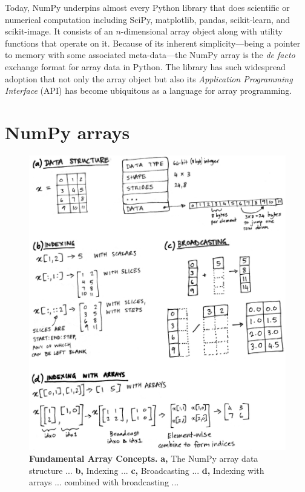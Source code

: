 Today, NumPy underpins almost every Python library that does scientific or
numerical computation including SciPy\cite{virtanen2019scipy},
matplotlib\cite{hunter2007matplotlib}, pandas\cite{mckinney-proc-scipy-2010},
scikit-learn\cite{pedregosa2011scikit}, and
scikit-image\cite{vanderwalt2014scikit}.
It consists of an $n$-dimensional array object along with utility functions
that operate on it.
Because of its inherent simplicity---being a pointer to memory with some
associated meta-data---the NumPy array is
the {\it de facto} exchange format for array data in Python.
The library has such widespread adoption that not only the array object but also its
{\it Application Programming Interface} (API) has become ubiquitous as
a language for array programming.


\section*{NumPy arrays}

\begin{figure}
  \centering
  \includegraphics[width=\textwidth]{static/sketches/array-concepts}
  \caption{\textbf{Fundamental Array Concepts.}
    \textbf{a,} The NumPy array data structure ...
    \textbf{b,} Indexing ...
    \textbf{c,} Broadcasting ...
    \textbf{d,} Indexing with arrays ... combined with broadcasting ...
   }
  \label{fig:array-concepts}
\end{figure}

